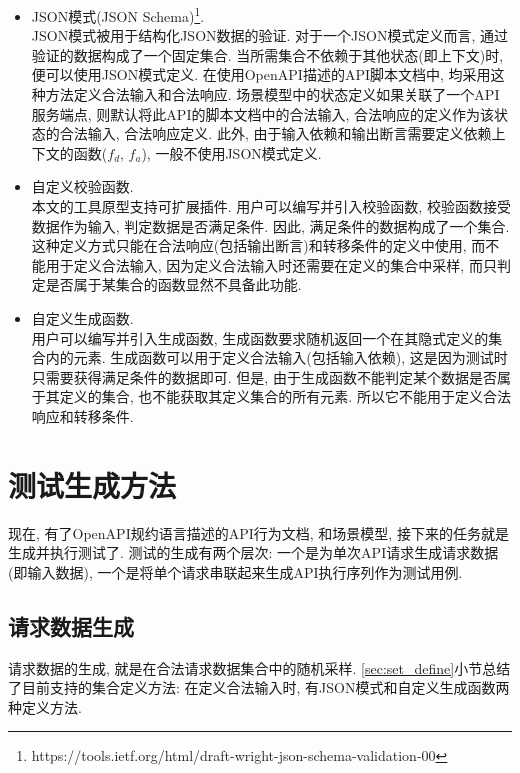             \label{sec:set_define}
            \begin{itemize}
                \item JSON模式(JSON Schema)\footnote{https://tools.ietf.org/html/draft-wright-json-schema-validation-00}.\\
                JSON模式被用于结构化JSON数据的验证. 对于一个JSON模式定义而言, 通过验证的数据构成了一个固定集合. 当所需集合不依赖于其他状态(即上下文)时, 便可以使用JSON模式定义. 在使用OpenAPI描述的API脚本文档中, 均采用这种方法定义合法输入和合法响应. 场景模型中的状态定义如果关联了一个API服务端点, 则默认将此API的脚本文档中的合法输入, 合法响应的定义作为该状态的合法输入, 合法响应定义. 此外, 由于输入依赖和输出断言需要定义依赖上下文的函数($f_d$, $f_a$), 一般不使用JSON模式定义. 
                
                \item 自定义校验函数.\\
                本文的工具原型支持可扩展插件. 用户可以编写并引入校验函数, 校验函数接受数据作为输入, 判定数据是否满足条件. 因此, 满足条件的数据构成了一个集合. 这种定义方式只能在合法响应(包括输出断言)和转移条件的定义中使用, 而不能用于定义合法输入, 因为定义合法输入时还需要在定义的集合中采样, 而只判定是否属于某集合的函数显然不具备此功能.
                
                \item 自定义生成函数.\\
                用户可以编写并引入生成函数, 生成函数要求随机返回一个在其隐式定义的集合内的元素. 生成函数可以用于定义合法输入(包括输入依赖), 这是因为测试时只需要获得满足条件的数据即可. 但是, 由于生成函数不能判定某个数据是否属于其定义的集合, 也不能获取其定义集合的所有元素. 所以它不能用于定义合法响应和转移条件.
            \end{itemize}
            
    
    \section{测试生成方法}
        现在, 有了OpenAPI规约语言描述的API行为文档, 和场景模型, 接下来的任务就是生成并执行测试了. 测试的生成有两个层次: 一个是为单次API请求生成请求数据(即输入数据), 一个是将单个请求串联起来生成API执行序列作为测试用例.
        
        \subsection{请求数据生成}
            请求数据的生成, 就是在合法请求数据集合中的随机采样. \ref{sec:set_define}小节总结了目前支持的集合定义方法: 在定义合法输入时, 有JSON模式和自定义生成函数两种定义方法.
            
